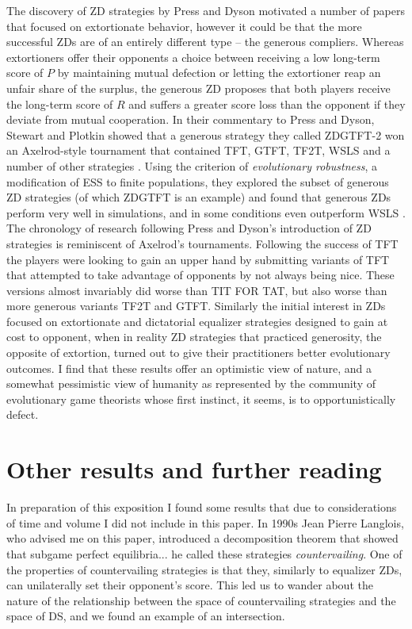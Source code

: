 The discovery of ZD strategies by Press and Dyson motivated a number of papers that focused on extortionate behavior, however it could be that the more successful ZDs are of an entirely different type -- the generous compliers. Whereas extortioners offer their opponents a choice between receiving a low long-term score of $P$ by maintaining mutual defection or letting the extortioner reap an unfair share of the surplus, the generous ZD proposes that both players receive the long-term score of $R$ and suffers a greater score loss than the opponent if they deviate from mutual cooperation. In their commentary to Press and Dyson, Stewart and Plotkin showed that a generous strategy they called ZDGTFT-2 won an Axelrod-style tournament that contained TFT, GTFT, TF2T, WSLS and a number of other strategies \cite{Stewart26062012}. Using the criterion of \textit{evolutionary robustness}, a modification of ESS to finite populations, they explored the subset of generous ZD strategies (of which ZDGTFT is an example) and found that generous ZDs perform very well in simulations, and in some conditions even outperform WSLS \cite{Stewart03092013}. The chronology of research following Press and Dyson's introduction of ZD strategies is reminiscent of Axelrod's tournaments. Following the success of TFT the players were looking to gain an upper hand by submitting variants of TFT that attempted to take advantage of opponents by not always being nice. These versions almost invariably did worse than TIT FOR TAT, but also worse than more generous variants TF2T and GTFT. Similarly the initial interest in ZDs focused on extortionate and dictatorial equalizer strategies designed to gain at cost to opponent, when in reality ZD strategies that practiced generosity, the opposite of extortion, turned out to give their practitioners better evolutionary outcomes. I find that these results offer an optimistic view of nature, and a somewhat pessimistic view of humanity as represented by the community of evolutionary game theorists whose first instinct, it seems, is to opportunistically defect.

\chapter{Other results and further reading}
In preparation of this exposition I found some results that due to considerations of time and volume I did not include in this paper. In 1990s Jean Pierre Langlois, who advised me on this paper, introduced a decomposition theorem that showed that subgame perfect equilibria... he called these strategies \textit{countervailing}. One of the properties of countervailing strategies is that they, similarly to equalizer ZDs, can unilaterally set their opponent's score. This led us to wander about the nature of the relationship between the space of countervailing strategies and the space of DS, and we found an example of an intersection.

